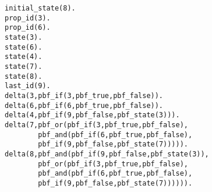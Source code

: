\begin{example}
        
        \begin{center}
                \begin{lstlisting}[] 
initial_state(8).
prop_id(3).
prop_id(6).
state(3).
state(6).
state(4).
state(7).
state(8).
last_id(9).
delta(3,pbf_if(3,pbf_true,pbf_false)).
delta(6,pbf_if(6,pbf_true,pbf_false)).
delta(4,pbf_if(9,pbf_false,pbf_state(3))).
delta(7,pbf_or(pbf_if(3,pbf_true,pbf_false),
        pbf_and(pbf_if(6,pbf_true,pbf_false),
        pbf_if(9,pbf_false,pbf_state(7))))).
delta(8,pbf_and(pbf_if(9,pbf_false,pbf_state(3)),
        pbf_or(pbf_if(3,pbf_true,pbf_false),
        pbf_and(pbf_if(6,pbf_true,pbf_false),
        pbf_if(9,pbf_false,pbf_state(7)))))).

                \end{lstlisting}
        \end{center}
\end{example}
